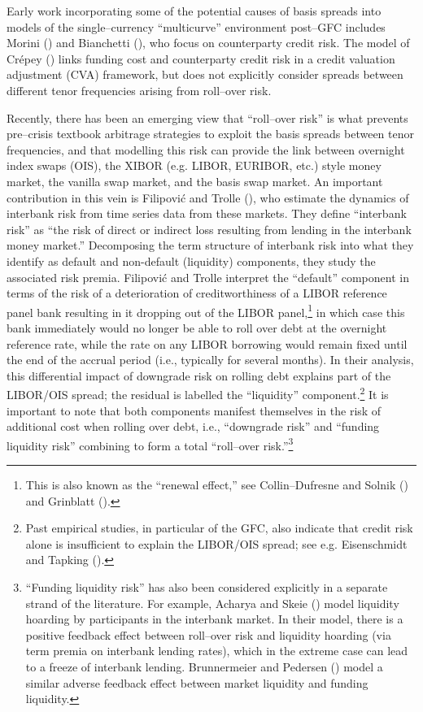 \documentclass[12pt,a4paper]{article}
\theoremstyle{plain}
\numberwithin{equation}{section}
\begin{document}
Early work incorporating some of the potential causes of basis spreads into models of the single--currency ``multicurve'' environment post--GFC includes Morini (\citeyear*{Morini:2009}) and Bianchetti (\citeyear*{Bianchetti:2010}), who focus on counterparty credit risk. The model of Cr\'epey (\citeyear*{Crepey:2015}) links funding cost and counterparty credit risk in a credit valuation adjustment (CVA) framework, but does not explicitly consider spreads between different tenor frequencies arising from roll--over risk.

Recently, there has been an emerging view that ``roll--over risk'' is what prevents pre--crisis textbook arbitrage strategies to exploit the basis spreads between tenor frequencies, and that modelling this risk can provide the link between overnight index swaps (OIS), the XIBOR (e.g. LIBOR, EURIBOR, etc.) style money market, the vanilla swap market, and the basis swap market. An important contribution in this vein is Filipovi\'c and Trolle (\citeyear*{FilTro:2013}), who estimate the dynamics of interbank risk from time series data from these markets. They define ``interbank risk'' as ``the risk of direct or indirect loss resulting from lending in the interbank money market.'' Decomposing the term structure of interbank risk into what they identify as default and non-default (liquidity) components, they study the associated risk premia. Filipovi\'c and Trolle interpret the ``default'' component in terms of the risk of a deterioration of creditworthiness of a LIBOR reference panel bank resulting in it dropping out of the LIBOR panel,\footnote{This is also known as the ``renewal effect,'' see Collin--Dufresne and Solnik (\citeyear*{ColSol:2001}) and Grinblatt (\citeyear*{Grinblatt:2001}).} in which case this bank immediately would no longer be able to roll over debt at the overnight reference rate, while the rate on any LIBOR borrowing would remain fixed until the end of the accrual period (i.e., typically for several months). In their analysis, this differential impact of downgrade risk on rolling debt explains part of the LIBOR/OIS spread; the residual is labelled the ``liquidity'' component.\footnote{Past empirical studies, in particular of the GFC, also indicate that credit risk alone is insufficient to explain the LIBOR/OIS spread; see e.g. Eisenschmidt and Tapking (\citeyear*{EisTap:2009}).} It is important to note that both components manifest themselves in the risk of additional cost when rolling over debt, i.e., ``downgrade risk'' and ``funding liquidity risk'' combining to form a total ``roll--over risk.''\footnote{``Funding liquidity risk'' has also been considered explicitly in a separate strand of the literature. For example, Acharya and Skeie (\citeyear*{AchSke:2011}) model liquidity hoarding by participants in the interbank market. In their model, there is a positive feedback effect between roll--over risk and liquidity hoarding (via term premia on interbank lending rates), which in the extreme case can lead to a freeze of interbank lending. Brunnermeier and Pedersen (\citeyear*{BrunnermeierPedersen2009}) model a similar adverse feedback effect between market liquidity and funding liquidity.}
\end{document}
